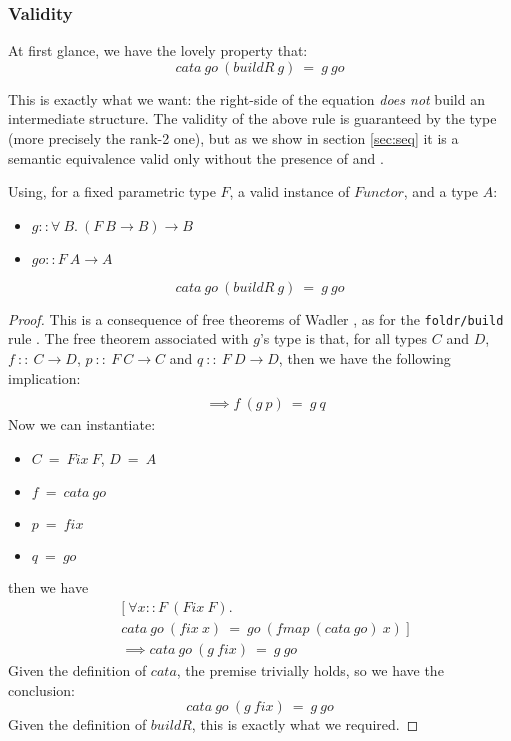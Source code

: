 \subsubsection{Validity}
At first glance, we have the lovely property that:
$$cata\ go\ (buildR\ g)\ =\ g\ go$$

This is exactly what we want: the right-side of the equation \emph{does not} build an intermediate structure. The validity of the above rule is guaranteed by the type (more precisely the rank-2 one), but as we show in section \ref{sec:seq} it is a semantic equivalence valid only without the presence of  and .

\begin{theorem}
Using, for a fixed parametric type $F$, a valid instance of $Functor$, and a type $A$:
\begin{itemize}
	\item $g :: \forall\ B.\ (F\ B \to B) \to B$
	\item $go :: F\ A \to A $
\end{itemize}
$$cata\ go\ (buildR\ g)\ =\ g\ go$$
\end{theorem}
\begin{proof}
This is a consequence of free theorems of Wadler \cite{Wadler:1989:TF:99370.99404}, as for the \verb|foldr/build| rule \cite{Gill:1993:SCD:165180.165214}. The free theorem associated with $g$'s type is that, for all types $C$ and $D$, $f\ ::\ C \to D$, $p\ ::\ F\ C \to C$ and $q\ ::\ F\ D \to D$, then we have the following implication:
\begin{align*}
[\ \forall& x::C.\ f\ (p\ x)\ =\ q\ (fmap\ f\ x)\ ]\\
&\implies f\ (g\ p)\ =\ g\ q
\end{align*}
Now we can instantiate:
\begin{itemize}
	\item $C\ =\ Fix\ F$, $D\ =\ A$
	\item $f\ =\ cata\ go$
	\item $p\ =\ fix$
	\item $q\ =\ go$
\end{itemize}
then we have
\begin{align*}
&[\ \forall x::F\ (Fix\ F).\\
&cata\ go\ (fix\ x)\ =\ go\ (fmap\ (cata\ go)\ x)\ ]\\
&\implies cata\ go\ (g\ fix)\ =\ g\ go
\end{align*}
Given the definition of $cata$, the premise trivially holds, so we have the conclusion:
$$cata\ go\ (g\ fix)\ =\ g\ go$$
Given the definition of $buildR$, this is exactly what we required.
\end{proof}

